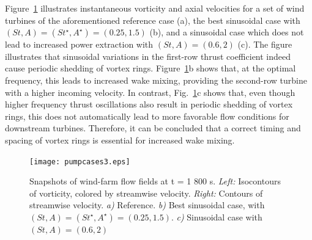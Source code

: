 \documentclass[wes, manuscript]{copernicus}
\begin{document}
Figure~\ref{fig:vorticity_parametersweep} illustrates instantaneous vorticity and axial velocities for a set of wind turbines of the aforementioned reference case (a), the best sinusoidal case with $(St, A) = (St^\star, A^\star)= (0.25, 1.5)$ (b), and a sinusoidal case which does not lead to increased power extraction with $(St, A) = (0.6, 2)$ (c). The figure illustrates that sinusoidal variations in the first-row thrust coefficient indeed cause periodic shedding of vortex rings. Figure~\ref{fig:vorticity_parametersweep}b shows that, at the optimal frequency, this leads to increased wake mixing, providing the second-row turbine with a higher incoming velocity. In contrast, Fig.~\ref{fig:vorticity_parametersweep}c shows that, even though higher frequency thrust oscillations also result in periodic shedding of vortex rings, this does not automatically lead to more favorable flow conditions for downstream turbines. Therefore, it can be concluded that a correct timing and spacing of vortex rings is essential for increased wake mixing.
\begin{figure}
	\centering
	\texttt{[image: pumpcases3.eps]}
	\caption{Snapshots of wind-farm flow fields at t = 1 800 s. \emph{Left: } Isocontours of vorticity, colored by streamwise velocity. \emph{Right: } Contours of streamwise velocity. \emph{a)} Reference. \emph{b)} Best sinusoidal case, with $(St , A) = (St^\star, A^\star) = (0.25, 1.5)$. \emph{c)} Sinusoidal case with $(St, A) = (0.6, 2)$ \label{fig:vorticity_parametersweep}  }
\end{figure}
\end{document}
